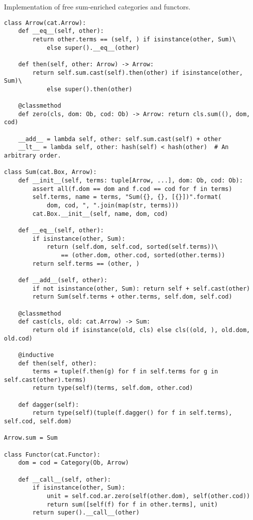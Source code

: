 \begin{python}
{\normalfont Implementation of free sum-enriched categories and functors.}

\begin{verbatim}
class Arrow(cat.Arrow):
    def __eq__(self, other):
        return other.terms == (self, ) if isinstance(other, Sum)\
            else super().__eq__(other)

    def then(self, other: Arrow) -> Arrow:
        return self.sum.cast(self).then(other) if isinstance(other, Sum)\
            else super().then(other)

    @classmethod
    def zero(cls, dom: Ob, cod: Ob) -> Arrow: return cls.sum((), dom, cod)

    __add__ = lambda self, other: self.sum.cast(self) + other
    __lt__ = lambda self, other: hash(self) < hash(other)  # An arbitrary order.

class Sum(cat.Box, Arrow):
    def __init__(self, terms: tuple[Arrow, ...], dom: Ob, cod: Ob):
        assert all(f.dom == dom and f.cod == cod for f in terms)
        self.terms, name = terms, "Sum({}, {}, [{}])".format(
            dom, cod, ", ".join(map(str, terms)))
        cat.Box.__init__(self, name, dom, cod)

    def __eq__(self, other):
        if isinstance(other, Sum):
            return (self.dom, self.cod, sorted(self.terms))\
                == (other.dom, other.cod, sorted(other.terms))
        return self.terms == (other, )

    def __add__(self, other):
        if not isinstance(other, Sum): return self + self.cast(other)
        return Sum(self.terms + other.terms, self.dom, self.cod)

    @classmethod
    def cast(cls, old: cat.Arrow) -> Sum:
        return old if isinstance(old, cls) else cls((old, ), old.dom, old.cod)

    @inductive
    def then(self, other):
        terms = tuple(f.then(g) for f in self.terms for g in self.cast(other).terms)
        return type(self)(terms, self.dom, other.cod)

    def dagger(self):
        return type(self)(tuple(f.dagger() for f in self.terms), self.cod, self.dom)

Arrow.sum = Sum

class Functor(cat.Functor):
    dom = cod = Category(Ob, Arrow)

    def __call__(self, other):
        if isinstance(other, Sum):
            unit = self.cod.ar.zero(self(other.dom), self(other.cod))
            return sum([self(f) for f in other.terms], unit)
        return super().__call__(other)
\end{verbatim}
\end{python}

